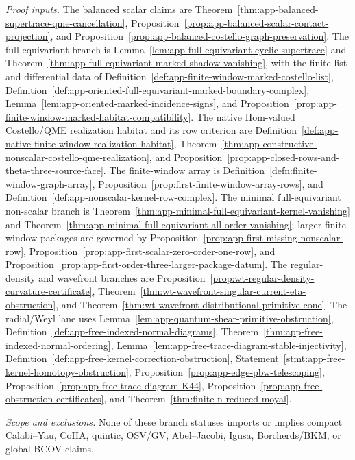 \begin{stmt}
  \emph{Proof inputs.}
  The balanced scalar claims are
  Theorem~\ref{thm:app-balanced-supertrace-qme-cancellation},
  Proposition~\ref{prop:app-balanced-scalar-contact-projection}, and
  Proposition~\ref{prop:app-balanced-costello-graph-preservation}.  The
  full-equivariant branch is
  Lemma~\ref{lem:app-full-equivariant-cyclic-supertrace} and
  Theorem~\ref{thm:app-full-equivariant-marked-shadow-vanishing}, with
  the finite-list and differential data of
  Definition~\ref{def:app-finite-window-marked-costello-list},
  Definition~\ref{def:app-oriented-full-equivariant-marked-boundary-complex},
  Lemma~\ref{lem:app-oriented-marked-incidence-signs}, and
  Proposition~\ref{prop:app-finite-window-marked-habitat-compatibility}.
  The native Hom-valued Costello/QME realization habitat and its row
  criterion are
  Definition~\ref{def:app-native-finite-window-realization-habitat},
  Theorem~\ref{thm:app-constructive-nonscalar-costello-qme-realization},
  and Proposition~\ref{prop:app-closed-rows-and-theta-three-source-face}.
  The finite-window array is
  Definition~\ref{defn:finite-window-graph-array},
  Proposition~\ref{prop:first-finite-window-array-rows}, and
  Definition~\ref{def:app-nonscalar-kernel-row-complex}.  The minimal
  full-equivariant non-scalar branch is
  Theorem~\ref{thm:app-minimal-full-equivariant-kernel-vanishing} and
  Theorem~\ref{thm:app-minimal-full-equivariant-all-order-vanishing};
  larger finite-window packages are governed by
  Proposition~\ref{prop:app-first-missing-nonscalar-row},
  Proposition~\ref{prop:app-first-scalar-zero-order-one-row}, and
  Proposition~\ref{prop:app-first-order-three-larger-package-datum}.  The
  regular-density and wavefront branches are
  Proposition~\ref{prop:wt-regular-density-curvature-certificate},
  Theorem~\ref{thm:wt-wavefront-singular-current-eta-obstruction}, and
  Theorem~\ref{thm:wt-wavefront-distributional-primitive-cone}.  The
  radial/Weyl lane uses
  Lemma~\ref{lem:app-quantum-shear-primitive-obstruction},
  Definition~\ref{def:app-free-indexed-normal-diagrams},
  Theorem~\ref{thm:app-free-indexed-normal-ordering},
  Lemma~\ref{lem:app-free-trace-diagram-stable-injectivity},
  Definition~\ref{def:app-free-kernel-correction-obstruction},
  Statement~\ref{stmt:app-free-kernel-homotopy-obstruction},
  Proposition~\ref{prop:app-edge-pbw-telescoping},
  Proposition~\ref{prop:app-free-trace-diagram-K44},
  Proposition~\ref{prop:app-free-obstruction-certificates}, and
  Theorem~\ref{thm:finite-n-reduced-moyal}.

  \emph{Scope and exclusions.} None of these branch statuses imports or
  implies compact Calabi--Yau, CoHA, quintic, OSV/GV, Abel--Jacobi,
  Igusa, Borcherds/BKM, or global BCOV claims.
\end{stmt}

